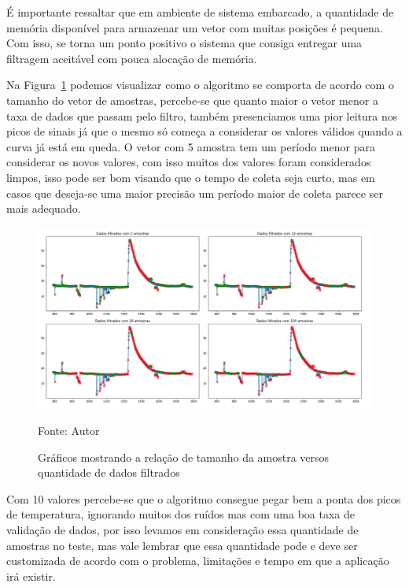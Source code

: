 É importante ressaltar que em ambiente de sistema embarcado, a quantidade de memória disponível para armazenar um vetor com muitas posições é pequena. Com isso, se torna um ponto positivo o sistema que consiga entregar uma filtragem aceitável com pouca alocação de memória.

Na Figura~\ref{fig: graficos_tamanhos_amostras} podemos visualizar como o algoritmo se comporta de acordo com o tamanho do vetor de amostras, percebe-se que quanto maior o vetor menor a taxa de dados que passam pelo filtro, também presenciamos uma pior leitura nos picos de sinais já que o mesmo só começa a considerar os valores válidos quando a curva já está em queda. O vetor com 5 amostra tem um período menor para considerar os novos valores, com isso muitos dos valores foram considerados limpos, isso pode ser bom visando que o tempo de coleta seja curto, mas em casos que deseja-se uma maior precisão um período maior de coleta parece ser mais adequado. 


\begin{figure}[H]
	\centering
	\includegraphics[width=15cm]{imagens/sensores/graficos_tamanhos_amostras.jpg}
	\caption{Gráficos mostrando a relação de tamanho da amostra versos quantidade de dados filtrados}
	Fonte: Autor
	\label{fig: graficos_tamanhos_amostras}
\end{figure}

Com 10 valores percebe-se que o algoritmo consegue pegar bem a ponta dos picos de temperatura, ignorando muitos dos ruídos mas com uma boa taxa de validação de dados, por isso levamos em consideração essa quantidade de amostras no teste, mas vale lembrar que essa quantidade pode e deve ser customizada de acordo com o problema, limitações e tempo em que a aplicação irá existir.

